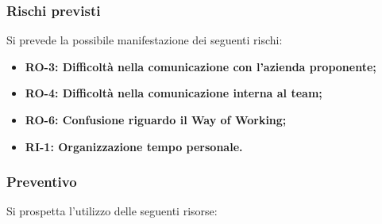 \documentclass[a4paper,12pt]{article}
\newlength{\namecol}
\begin{document}
{        \subsubsection{Rischi previsti}{
            Si prevede la possibile manifestazione dei seguenti rischi:
            \begin{itemize}
                \item \textbf{RO-3: Difficoltà nella comunicazione con l'azienda proponente;}
                \item \textbf{RO-4: Difficoltà nella comunicazione interna al team;}
                \item \textbf{RO-6: Confusione riguardo il Way of Working;}
                \item \textbf{RI-1: Organizzazione tempo personale.}
            \end{itemize}
        }

        \subsubsection{Preventivo}{
            Si prospetta l'utilizzo delle seguenti risorse:

            \begin{table}[H]
                \centering

                \hspace*{-14cm}%



\end{table}}}
\end{document}
